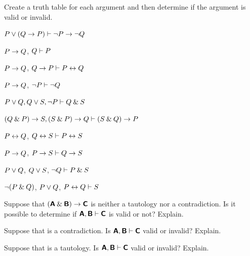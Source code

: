 \begin{small}
\problempart
\label{pr.TT.valid}
Create a truth table for each argument and then determine if the argument is valid or invalid.
\begin{earg}
\item $P\vee(Q\rightarrow P) \vdash {\neg} P \rightarrow {\neg} Q$\vspace{.5ex} %
\item $P\rightarrow Q$, $Q \vdash  P$\vspace{.5ex} %
\item $P \rightarrow Q$, $Q \rightarrow P\vdash P \leftrightarrow Q$\vspace{.5ex} %
\item $P \rightarrow Q$, ${\neg} P\vdash {\neg} Q$ \vspace{.5ex}%

\item $P\vee Q, Q\vee S, {\neg} P \vdash Q \mathbin{\&} S$\vspace{.5ex} %
\item $(Q\mathbin{\&} P)\rightarrow S, (S\mathbin{\&} P)\rightarrow Q \vdash (S\mathbin{\&} Q)\rightarrow P$\vspace{.5ex} %
\item $P\leftrightarrow Q$, $Q\leftrightarrow S \vdash P\leftrightarrow S$\vspace{.5ex} %
\item $P \rightarrow Q$, $P \rightarrow S\vdash Q \rightarrow S$\vspace{.5ex} %

\item $P\vee Q$, $Q\vee S$, ${\neg} Q \vdash P \mathbin{\&} S$\vspace{.5ex} %

\item ${\neg}(P \mathbin{\&} Q)$, $P \vee Q$, $P \leftrightarrow Q\vdash S$ \vspace{.5ex}%
\end{earg}


\problempart
\begin{earg}
\item Suppose that $(\bm{\mathsf{A}}\mathbin{\&}\bm{\mathsf{B}})\rightarrow\bm{\mathsf{C}}$ is neither a tautology nor a contradiction. Is it possible to determine if $\bm{\mathsf{A}}, \bm{\mathsf{B}} \vdash \bm{\mathsf{C}}$ is valid or not? Explain.
\item Suppose that  is a contradiction. Is $\bm{\mathsf{A}}, \bm{\mathsf{B}} \vdash \bm{\mathsf{C}}$ valid or invalid? Explain.
\item Suppose that  is a tautology. Is $\bm{\mathsf{A}}, \bm{\mathsf{B}}\vdash \bm{\mathsf{C}}$ valid or invalid? Explain.
\end{earg}



\end{small}
